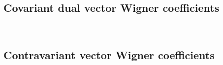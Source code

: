 \documentclass[12pt]{article}
\begin{document}
~~\
~~\
\subsection{Covariant dual vector Wigner coefficients}
~~\
~~\
\subsection{Contravariant vector Wigner coefficients}
~~\
~~\








%
\end{document}
